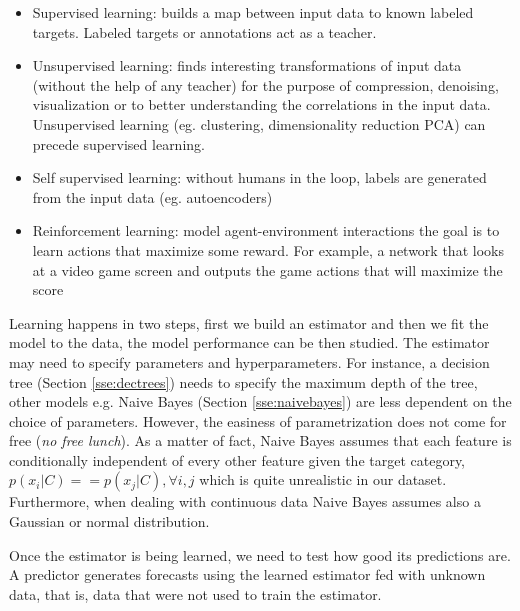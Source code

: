 \documentclass[11pt]{article}
\theoremstyle{definition}
\theoremstyle{remark}
\begin{document}
\begin{itemize}
\item Supervised learning: builds a map between input data to known labeled targets. Labeled targets or annotations act as a teacher.
\item Unsupervised learning: finds interesting transformations of input data (without the help of any teacher) for the purpose of compression, denoising, visualization or to better understanding the correlations in the input data. Unsupervised learning (eg. clustering, dimensionality reduction PCA) can precede supervised learning.
\item Self supervised learning: without humans in the loop, labels are generated from the input data (eg. autoencoders)
\item Reinforcement learning: model agent-environment interactions the goal is to learn actions that maximize some reward. For example, a network that looks at a video game screen and outputs the game actions that will maximize the score \cite{mnih2013playing}
\end{itemize}

Learning happens in two steps, first we build an estimator and then we fit the model to the data, the model performance can be then studied. The estimator may need to specify parameters and hyperparameters. For instance, a decision tree (Section \ref{sse:dectrees}) needs to specify the maximum depth of the tree, other models e.g. Naive Bayes (Section \ref{sse:naivebayes}) are less dependent on the choice of parameters. However, the easiness of parametrization does not come for free (\emph{no free lunch}). As a matter of fact, Naive Bayes assumes that each feature is conditionally independent of every other feature given the target category, $p(x_i|C) == p(x_j|C), \forall i,j$ which is quite unrealistic in our dataset. Furthermore, when dealing with continuous data Naive Bayes assumes also a Gaussian or normal distribution. 

Once the estimator is being learned, we need to test how good its predictions are. A predictor generates forecasts using the learned estimator fed with unknown data, that is, data that were not used to train the estimator.
\end{document}
